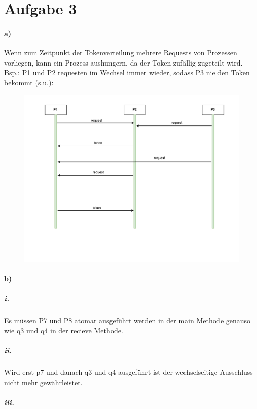 \documentclass{scrartcl}
\begin{document}
	
	\section*{Aufgabe 3}
		\paragraph*{a)}
		Wenn zum Zeitpunkt der Tokenverteilung mehrere Requests von Prozessen vorliegen, kann ein Prozess aushungern, da der Token zufällig zugeteilt wird.\\
		Bsp.: P1 und P2 requesten im Wechsel immer wieder, sodass P3 nie den Token bekommt (s.u.):\\[2em]
	
		\begin{figure}[h]
			\includegraphics[scale=0.7]{aufgabe3a.pdf}
		\end{figure}
	
		\paragraph*{b)}
			\subparagraph*{i.}
				Es müssen P7 und P8 atomar ausgeführt werden in der main Methode genauso wie q3 und q4 in der recieve Methode.
	
			\subparagraph*{ii.}
				Wird erst p7 und danach q3 und q4 ausgeführt ist der wechselseitige Ausschluss nicht mehr gewährleistet. 
			\subparagraph*{iii.}
	
\end{document}

